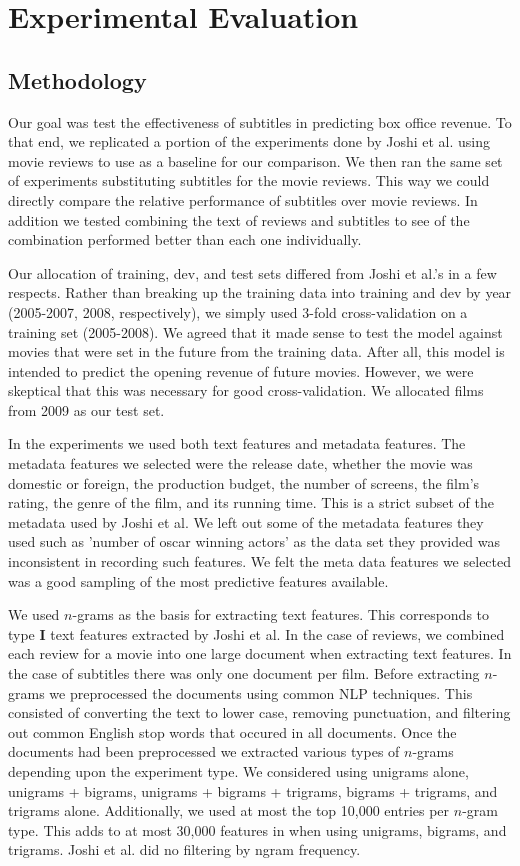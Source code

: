 \documentclass[11pt]{article}
\begin{document}
\section{Experimental Evaluation}
\subsection{Methodology}
Our goal was test the effectiveness of subtitles in predicting box office revenue.
To that end, we replicated a portion of the experiments done by Joshi et al. using
movie reviews to use as a baseline for our comparison. We then ran the same set of
experiments substituting subtitles for the movie reviews. This way we could directly
compare the relative performance of subtitles over movie reviews. In addition we
tested combining the text of reviews and subtitles to see of the combination performed
better than each one individually.

Our allocation of training, dev, and test sets differed from Joshi et al.'s in a few
respects. Rather than breaking up the training data into training and dev by year
(2005-2007, 2008, respectively), we simply used 3-fold cross-validation on a training
set (2005-2008). We agreed that it made sense to test the model against movies that were
set in the future from the training data. After all, this model is intended to predict
the opening revenue of future movies. However, we were skeptical that this was necessary
for good cross-validation. We allocated films from 2009 as our test set.

In the experiments we used both text features and metadata features. The metadata features
we selected were the release date, whether the movie was domestic or foreign, the production
budget, the number of screens, the film's rating, the genre of the film, and its running
time. This is a strict subset of the metadata used by Joshi et al. We left out some of the
metadata features they used such as 'number of oscar winning actors' as the data set they
provided was inconsistent in recording such features. We felt the meta data features we
selected was a good sampling of the most predictive features available.

We used $n$-grams as the basis for extracting text features. This corresponds to type
\textbf{I} text features extracted by Joshi et al. In the case of reviews, we combined
each review for a movie into one large document when extracting text features. In the
case of subtitles there was only one document per film. Before extracting $n$-grams we
preprocessed the documents using common NLP techniques. This consisted of converting
the text to lower case, removing punctuation, and filtering out common English stop words that occured in all documents. Once the documents had been preprocessed we extracted various types of $n$-grams depending upon the experiment type. We considered using unigrams alone,
unigrams + bigrams, unigrams + bigrams + trigrams, bigrams + trigrams, and trigrams alone.
Additionally, we used at most the top 10,000 entries per $n$-gram type. This adds to at most
30,000 features in when using unigrams, bigrams, and trigrams. Joshi et al. did no filtering
by ngram frequency.
\end{document}
